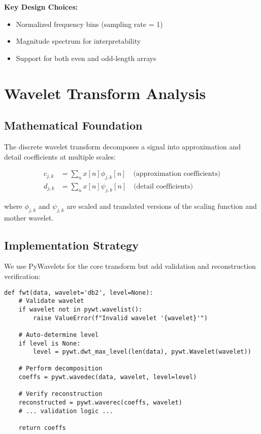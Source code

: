 \documentclass[11pt,a4paper]{article}
\begin{document}
\textbf{Key Design Choices:}
\begin{itemize}
    \item Normalized frequency bins (sampling rate = 1)
    \item Magnitude spectrum for interpretability
    \item Support for both even and odd-length arrays
\end{itemize}

\section{Wavelet Transform Analysis}

\subsection{Mathematical Foundation}

The discrete wavelet transform decomposes a signal into approximation and detail coefficients at multiple scales:

\begin{align}
c_{j,k} &= \sum_n x[n] \phi_{j,k}[n] \quad \text{(approximation coefficients)} \\
d_{j,k} &= \sum_n x[n] \psi_{j,k}[n] \quad \text{(detail coefficients)}
\end{align}

where $\phi_{j,k}$ and $\psi_{j,k}$ are scaled and translated versions of the scaling function and mother wavelet.

\subsection{Implementation Strategy}

We use PyWavelets for the core transform but add validation and reconstruction verification:

\begin{lstlisting}
def fwt(data, wavelet='db2', level=None):
    # Validate wavelet
    if wavelet not in pywt.wavelist():
        raise ValueError(f"Invalid wavelet '{wavelet}'")
    
    # Auto-determine level
    if level is None:
        level = pywt.dwt_max_level(len(data), pywt.Wavelet(wavelet))
    
    # Perform decomposition
    coeffs = pywt.wavedec(data, wavelet, level=level)
    
    # Verify reconstruction
    reconstructed = pywt.waverec(coeffs, wavelet)
    # ... validation logic ...
    
    return coeffs
\end{lstlisting}
\end{document}
